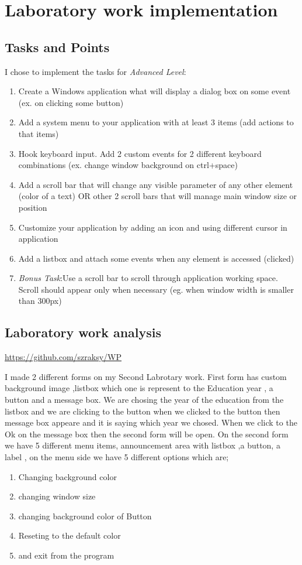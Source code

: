 \section{Laboratory work implementation}

\subsection{Tasks and Points}

I chose to implement the tasks for \textit{Advanced Level}:
\begin{enumerate}
	\item Create a Windows application what will display a dialog box on some event (ex. on clicking some button)
    \item Add a system menu to your application with at least 3 items (add actions to that items)
    \item Hook keyboard input. Add 2 custom events for 2 different keyboard combinations (ex. change window background on ctrl+space)
	\item Add a scroll bar that will change any visible parameter of any other element (color of a text) OR other 2 scroll bars that will manage main window size or position
    \item Customize your application by adding an icon and using different cursor in application
    \item Add a listbox and attach some events when any element is accessed (clicked) 
    \item \textit{Bonus Task}:Use a scroll bar to scroll through application working space. Scroll should appear only when necessary (eg. when window width is smaller than 300px)
\end{enumerate}

\subsection{Laboratory work analysis}

 \url{https://github.com/szraksy/WP}

I made 2 different forms on my Second Labrotary work. First form has
custom background image ,listbox which one is represent to the Education
year , a button and a message box.
We are chosing the year of the education from the listbox and we are
clicking to the button when we clicked to the button then message box
appeare and it is saying which year we chosed.
When we click to the Ok on the message box then the second form will be
open.
On the second form we have 5 different menu items, announcement area
with listbox ,a button, a label ,
on the menu side we have 5 different options which are;
\begin{enumerate}
	\item Changing background color
	\item changing window size
	\item changing background color of Button
	\item Reseting to the default color
	\item and exit from the program
\end{enumerate}

